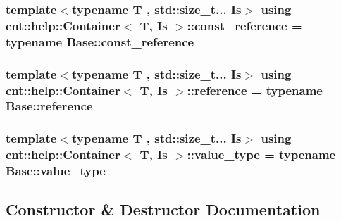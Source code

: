 \subsubsection[{\texorpdfstring{const\+\_\+reference}{const_reference}}]{\setlength{\rightskip}{0pt plus 5cm}template$<$typename T , std\+::size\+\_\+t... Is$>$ using {\bf cnt\+::help\+::\+Container}$<$ T, Is $>$\+::{\bf const\+\_\+reference} =  typename Base\+::const\+\_\+reference}\hypertarget{classcnt_1_1help_1_1Container_a388ebfcebe3759453a569af7d57267b5}{}\label{classcnt_1_1help_1_1Container_a388ebfcebe3759453a569af7d57267b5}
\subsubsection[{\texorpdfstring{reference}{reference}}]{\setlength{\rightskip}{0pt plus 5cm}template$<$typename T , std\+::size\+\_\+t... Is$>$ using {\bf cnt\+::help\+::\+Container}$<$ T, Is $>$\+::{\bf reference} =  typename Base\+::reference}\hypertarget{classcnt_1_1help_1_1Container_a11ea1092d03b288fe285601e98f7236c}{}\label{classcnt_1_1help_1_1Container_a11ea1092d03b288fe285601e98f7236c}
\subsubsection[{\texorpdfstring{value\+\_\+type}{value_type}}]{\setlength{\rightskip}{0pt plus 5cm}template$<$typename T , std\+::size\+\_\+t... Is$>$ using {\bf cnt\+::help\+::\+Container}$<$ T, Is $>$\+::{\bf value\+\_\+type} =  typename Base\+::value\+\_\+type}\hypertarget{classcnt_1_1help_1_1Container_ada2fa1912d0bac79c0c631fe9a804027}{}\label{classcnt_1_1help_1_1Container_ada2fa1912d0bac79c0c631fe9a804027}


\subsection{Constructor \& Destructor Documentation}
